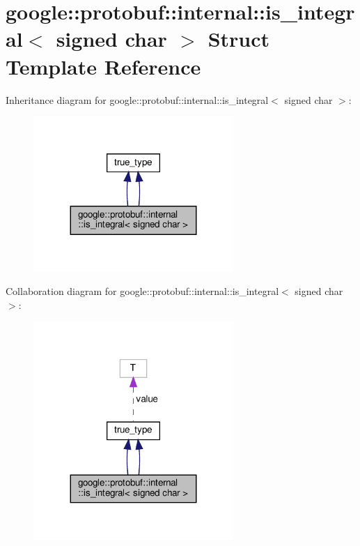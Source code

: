 \hypertarget{structgoogle_1_1protobuf_1_1internal_1_1is__integral_3_01signed_01char_01_4}{}\section{google\+:\+:protobuf\+:\+:internal\+:\+:is\+\_\+integral$<$ signed char $>$ Struct Template Reference}
\label{structgoogle_1_1protobuf_1_1internal_1_1is__integral_3_01signed_01char_01_4}


Inheritance diagram for google\+:\+:protobuf\+:\+:internal\+:\+:is\+\_\+integral$<$ signed char $>$\+:
\nopagebreak
\begin{figure}[H]
\begin{center}
\leavevmode
\includegraphics[width=215pt]{structgoogle_1_1protobuf_1_1internal_1_1is__integral_3_01signed_01char_01_4__inherit__graph}
\end{center}
\end{figure}


Collaboration diagram for google\+:\+:protobuf\+:\+:internal\+:\+:is\+\_\+integral$<$ signed char $>$\+:
\nopagebreak
\begin{figure}[H]
\begin{center}
\leavevmode
\includegraphics[width=215pt]{structgoogle_1_1protobuf_1_1internal_1_1is__integral_3_01signed_01char_01_4__coll__graph}
\end{center}
\end{figure}
